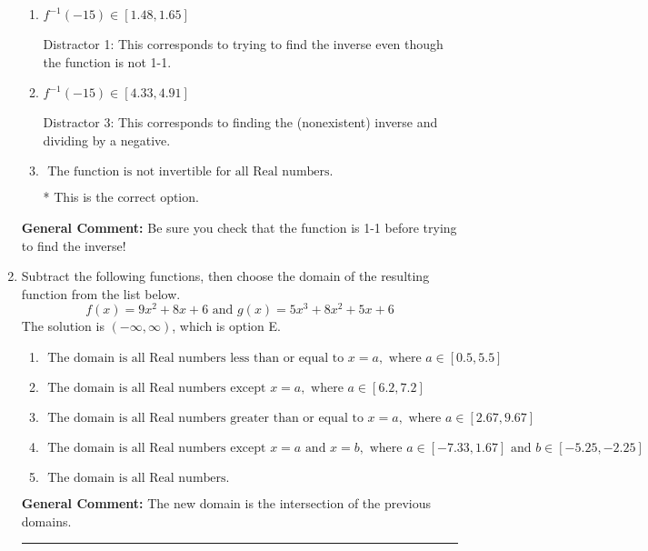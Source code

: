 \documentclass{extbook}[14pt]
\newcommand{\litem}[1]{\item #1

\rule{\textwidth}{0.4pt}}
\begin{document}
\begin{enumerate}
{\begin{enumerate}[label=\Alph*.]
 Distractor 2: This corresponds to finding the (nonexistent) inverse and not subtracting by the vertical shift.
\item \( f^{-1}(-15) \in [1.48, 1.65] \)

 Distractor 1: This corresponds to trying to find the inverse even though the function is not 1-1. 
\item \( f^{-1}(-15) \in [4.33, 4.91] \)

 Distractor 3: This corresponds to finding the (nonexistent) inverse and dividing by a negative.
\item \( \text{ The function is not invertible for all Real numbers. } \)

* This is the correct option.
\end{enumerate}

\textbf{General Comment:} Be sure you check that the function is 1-1 before trying to find the inverse!
}
\litem{
Subtract the following functions, then choose the domain of the resulting function from the list below.
\[ f(x) = 9x^{2} +8 x + 6 \text{ and } g(x) = 5x^{3} +8 x^{2} +5 x + 6 \]The solution is \( (-\infty, \infty) \), which is option E.\begin{enumerate}[label=\Alph*.]
\item \( \text{ The domain is all Real numbers less than or equal to } x = a, \text{ where } a \in [0.5, 5.5] \)


\item \( \text{ The domain is all Real numbers except } x = a, \text{ where } a \in [6.2, 7.2] \)


\item \( \text{ The domain is all Real numbers greater than or equal to } x = a, \text{ where } a \in [2.67, 9.67] \)


\item \( \text{ The domain is all Real numbers except } x = a \text{ and } x = b, \text{ where } a \in [-7.33, 1.67] \text{ and } b \in [-5.25, -2.25] \)


\item \( \text{ The domain is all Real numbers. } \)


\end{enumerate}

\textbf{General Comment:} The new domain is the intersection of the previous domains.
}
\end{enumerate}
\end{document}
